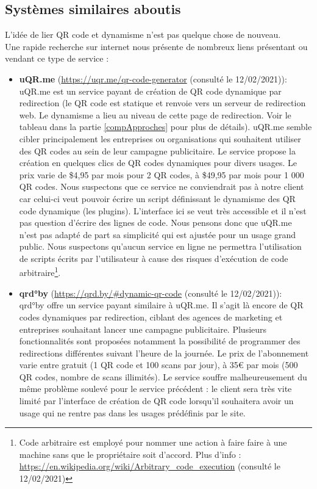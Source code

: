 \documentclass[a4paper,12pt]{article}
\begin{document}
\fi %

\subsection{Systèmes similaires aboutis}
\noindent L'idée de lier QR code et dynamisme n'est pas quelque chose de nouveau.\\
Une rapide recherche sur internet nous présente de nombreux liens présentant ou vendant ce type de service :\\

\begin{itemize}

    \item \textbf{uQR.me} (\url{https://uqr.me/qr-code-generator} (consulté le 12/02/2021)):\\
    uQR.me est un service payant de création de QR code dynamique par redirection (le QR code est statique et renvoie vers un serveur de redirection web. Le dynamisme a lieu au niveau de cette page de redirection. Voir le tableau dans la partie \ref{compApproches} pour plus de détails). uQR.me semble cibler principalement les entreprises ou organisations qui souhaitent utiliser des QR codes au sein de leur campagne publicitaire. Le service propose la création en quelques clics de QR codes dynamiques pour divers usages. Le prix varie de \$4,95 par mois pour 2 QR codes, à \$49,95 par mois pour 1 000 QR codes. Nous suspectons que ce service ne conviendrait pas à notre client car celui-ci veut pouvoir écrire un script définissant le dynamisme des QR code dynamique (les plugins). L'interface ici se veut très accessible et il n'est pas question d'écrire des lignes de code. Nous pensons donc que uQR.me n'est pas adapté de part sa simplicité qui est ajustée pour un usage grand public. Nous suspectons qu'aucun service en ligne ne permettra l'utilisation de scripts écrits par l'utilisateur à cause des risques d'exécution de code arbitraire\footnote{Code arbitraire est employé pour nommer une action à faire faire à une machine sans que le propriétaire soit d'accord. Plus d'info : \url{https://en.wikipedia.org/wiki/Arbitrary\_code\_execution} (consulté le 12/02/2021)}.\\
    
    \item \textbf{qrd°by} (\url{https://qrd.by/#dynamic-qr-code} (consulté le 12/02/2021)):\\
    qrd°by offre un service payant similaire à uQR.me. Il s'agit là encore de QR codes dynamiques par redirection, ciblant des agences de marketing et entreprises souhaitant lancer une campagne publicitaire. Plusieurs fonctionnalités sont proposées notamment la possibilité de programmer des redirections différentes suivant l'heure de la journée. Le prix de l'abonnement varie entre gratuit (1 QR code et 100 scans par jour), à 35€ par mois (500 QR codes, nombre de scans illimités). Le service souffre malheureusement du même problème soulevé pour le service précédent : le client sera très vite limité par l'interface de création de QR code lorsqu'il souhaitera avoir un usage qui ne rentre pas dans les usages prédéfinis par le site.\\
    

\end{itemize}
\end{document}
